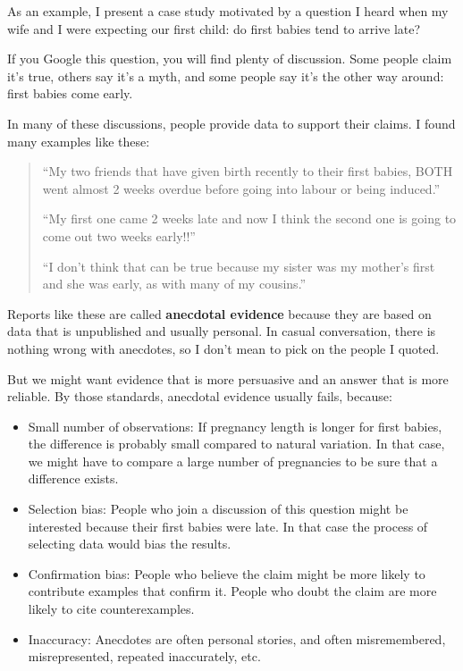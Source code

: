 \documentclass[12pt]{book}
\begin{document}
As an example, I present a case study motivated by a question
I heard when my wife and I were expecting our first child: do first
babies tend to arrive late?

If you Google this question, you will find plenty of discussion.  Some
people claim it's true, others say it's a myth, and some people say
it's the other way around: first babies come early.

In many of these discussions, people provide data to support their
claims.  I found many examples like these:

\begin{quote}

``My two friends that have given birth recently to their first babies,
BOTH went almost 2 weeks overdue before going into labour or being
induced.''

``My first one came 2 weeks late and now I think the second one is
going to come out two weeks early!!''

``I don't think that can be true because my sister was my mother's
first and she was early, as with many of my cousins.''

\end{quote}

Reports like these are called {\bf anecdotal evidence} because they
are based on data that is unpublished and usually personal.  In casual
conversation, there is nothing wrong with anecdotes, so I don't mean
to pick on the people I quoted.

But we might want evidence that is more persuasive and
an answer that is more reliable.  By those standards, anecdotal
evidence usually fails, because:

\begin{itemize}

\item Small number of observations: If pregnancy length is longer
  for first babies, the difference is probably small compared to
  natural variation.  In that case, we might have to compare a large
  number of pregnancies to be sure that a difference exists.

\item Selection bias: People who join a discussion of this question
  might be interested because their first babies were late.  In that
  case the process of selecting data would bias the results.

\item Confirmation bias:  People who believe the claim might be more
  likely to contribute examples that confirm it.  People who doubt the
  claim are more likely to cite counterexamples.

\item Inaccuracy: Anecdotes are often personal stories, and often
  misremembered, misrepresented, repeated
  inaccurately, etc.

\end{itemize}
\end{document}
